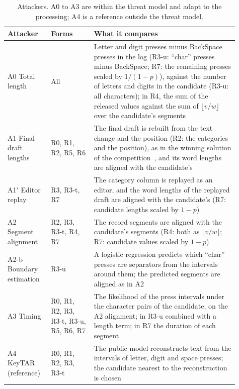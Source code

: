\begin{table}
  \caption{Attackers. A0 to A3 are within the threat model and adapt to the processing; A4 is a reference outside the
  threat model.}
  \label{tab:attackers}
  \small
  \begin{tabular}{>{\raggedright\arraybackslash}p{0.16\linewidth}>{\raggedright\arraybackslash}p{0.17\linewidth}>{\raggedright\arraybackslash}p{0.58\linewidth}}
    \toprule
    Attacker & Forms & What it compares \\
    \midrule
    A0 Total length & All & Letter and digit presses minus BackSpace presses in the log (R3-u: ``char'' presses
      minus BackSpace; R7: the remaining presses scaled by $1/(1-p)$), against the number of letters and digits in the
      candidate (R3-u: all characters); in R4, the sum of the released values against the sum of $\lfloor v/w
      \rfloor$ over the candidate's segments \\
    A1 Final-draft lengths & R0, R1, R2, R5, R6 & The final draft is rebuilt from the text change and the position (R2:
      the categories and the position), as in the winning solution of the competition~\cite{inubushi2024first}, and
      its word lengths are aligned with the candidate's \\
    A1$'$ Editor replay & R3, R3-t, R7 & The category column is replayed as an editor, and the word lengths of the
      replayed draft are aligned with the candidate's (R7: candidate lengths scaled by $1-p$) \\
    A2 Segment alignment & R2, R3, R3-t, R4, R7 & The record segments are aligned with the candidate's segments (R4:
      both as $\lfloor v/w \rfloor$; R7: candidate values scaled by $1-p$) \\
    A2-b Boundary estimation & R3-u & A logistic regression predicts which ``char'' presses are separators from the
      intervals around them; the predicted segments are aligned as in A2 \\
    A3 Timing & R0, R1, R2, R3, R3-t, R3-u, R5, R6, R7 & The likelihood of the press intervals under the character
      pairs of the candidate, on the A2 alignment; in R3-u combined with a length term; in R7 the duration of each
      segment \\
    A4 KeyTAR (reference) & R0, R1, R2, R3, R3-t & The public model reconstructs text from the intervals of letter, digit
      and space presses; the candidate nearest to the reconstruction is chosen \\
    \bottomrule
  \end{tabular}
\end{table}

